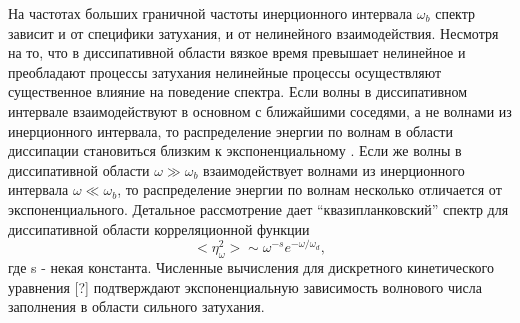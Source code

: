 
На частотах больших граничной частоты инерционного интервала $\omega_b$ спектр зависит и от специфики затухания, и от нелинейного взаимодействия. Несмотря на то, что в диссипативной области вязкое время превышает нелинейное и преобладают процессы затухания нелинейные процессы осуществляют существенное влияние на поведение спектра. Если волны в диссипативном интервале взаимодействуют в основном с ближайшими соседями, а не волнами из инерционного интервала, то распределение энергии по волнам в области диссипации становиться близким к экспоненциальному .
Если же волны в диссипативной области $\omega \gg \omega_b$ взаимодействует волнами из инерционного интервала $\omega \ll \omega_b$, то распределение энергии по волнам несколько отличается от экспоненциального. Детальное рассмотрение дает “квазипланковский” спектр для диссипативной области корреляционной функции \cite{Ryzhenkova1990}
\begin{equation}
<\eta_\omega^2> \sim \omega^{-s} e^{-\omega/\omega_d},
\end{equation}			
где s - некая константа. Численные вычисления для дискретного кинетического уравнения [?] подтверждают экспоненциальную зависимость волнового числа заполнения в области сильного затухания.
	

%
%



